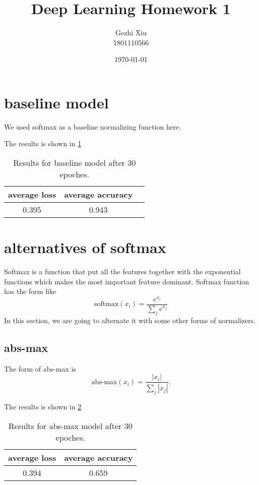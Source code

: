 \documentclass[12pt]{extarticle}
\title{Deep Learning Homework 1}
\author{Gezhi Xiu\\1801110566}
\date{\today}
\begin{document}
\maketitle

\section*{baseline model}

We used softmax as a baseline normalizing function here. 

The results is shown in \ref{table:1}

	\begin{table}[h]
		\centering
	\begin{tabular}{ |c| c| c |}
		\hline
		average loss & average accuracy \\ 
		\hline
		0.395 & 0.943 \\  
		\hline
	\end{tabular}

\caption{Results for baseline model after 30 epoches.}
\label{table:1}
\end{table}

\section{alternatives of softmax}

Softmax is a function that put all the features together with the exponential functions which makes the most important feature dominant. Softmax function has the form like $$\text{softmax}(x_i) = \frac{e^{x_i}}{\sum_j e^{x_j}}$$ In this section, we are going to alternate it with some other forms of normalizers.

\subsection{abs-max}

The form of abs-max is $$\text{abs-max}(x_i) = \frac{|x_i|}{\sum_j |x_j|}.$$

The results is shown in \ref{table:2}

	\begin{table}[h]
		\centering
	\begin{tabular}{ |c| c|}
		\hline
		average loss & average accuracy \\ 
		\hline
		0.394 & 0.659 \\  
		\hline
	\end{tabular}

\caption{Results for abs-max model after 30 epoches.}
\label{table:2}
\end{table}
\end{document}
